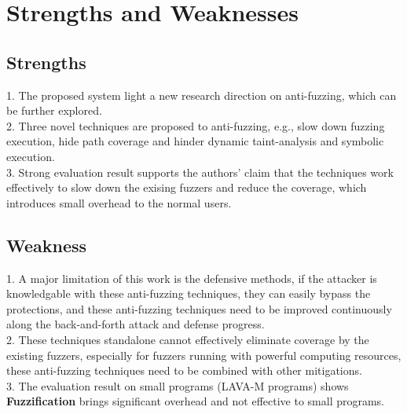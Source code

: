 \documentclass[letterpaper,11pt]{article}
\begin{document}
\section{Strengths and Weaknesses}
\subsection {Strengths}
1. The proposed system light a new research direction on anti-fuzzing, which can be further explored.\\
2. Three novel techniques are proposed to anti-fuzzing, e.g., slow down fuzzing execution, hide path coverage and hinder dynamic taint-analysis and symbolic execution.\\
3. Strong evaluation result supports the authors' claim that the techniques work effectively to slow down the exising fuzzers and reduce the coverage, which introduces small overhead to the normal users. 

\subsection {Weakness}
1. A major limitation of this work is the defensive methods, if the attacker is knowledgable with these anti-fuzzing techniques, they can easily bypass the protections, and these anti-fuzzing techniques need to be improved continuously along the back-and-forth attack and defense progress.\\ 
2. These techniques standalone cannot effectively eliminate coverage by the existing fuzzers, especially for fuzzers running with powerful computing resources, these anti-fuzzing techniques need to be combined with other mitigations.\\ 
3. The evaluation result on small programs (LAVA-M programs) shows \textbf{Fuzzification} brings significant overhead and not effective to small programs.


  
\end{document}
